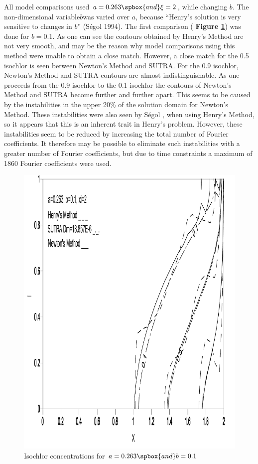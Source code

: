 All model comparisons used $a = 0.263 \spbox{and} \xi =2$, while changing $b$. The non-dimensional
variable$b$was varied over $a$, because ``Henry's solution is very sensitive to changes in $b$''
(S\'egol 1994). The first comparison ( \textbf{Figure \ref{fig:b10-1}}) was done for $b=0.1$. As one
can see the contours obtained by Henry's Method are not very smooth, and may be the reason why model
comparisons using this method were unable to obtain a close match.  However, a close match for the
0.5 isochlor is seen between Newton's Method and SUTRA. For the 0.9 isochlor, Newton's Method and
SUTRA contours are almost indistinguishable. As one proceeds from the 0.9 isochlor to the 0.1
isochlor the contours of Newton's Method and SUTRA become further and further apart. This seems to
be caused by the instabilities in the upper 20\% of the solution domain for Newton's Method. These
instabilities were also seen by S\'egol \cite{Segol}, when using Henry's Method, so it appears that
this is an inherent trait in Henry's problem. However, these instabilities seem to be reduced by
increasing the total number of Fourier coefficients. It therefore may be possible to eliminate such
instabilities with a greater number of Fourier coefficients, but due to time constraints a maximum
of 1860 Fourier coefficients were used.

\begin{figure}[htp] \centering
    \includegraphics[totalheight=0.45 \textheight,viewport=3mm 4mm 205mm 292mm]
    {image2}
    \caption{Isochlor concentrations for $a = 0.263 \spbox{and} b =
    0.1$} \label{fig:b10-1}
\end{figure}

